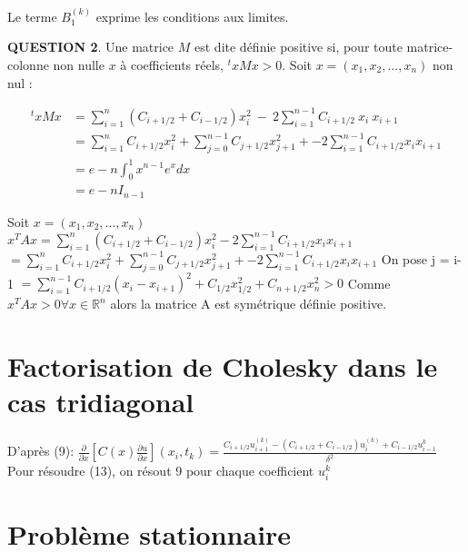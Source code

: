 \documentclass[a4paper,11pt]{article}
\newcommand{\R}{\mathbb{R}}
\newcommand{\quest}[1]{\small\textbf{#1}\normalsize}
\theoremstyle{nonumberplain}
\begin{document}
    \medskip
    Le terme $B_{1}^{(k)}$ exprime les conditions aux limites.

    \quest{QUESTION 2}. Une matrice $M$ est dite définie positive si, pour toute matrice-colonne non nulle $x$ à coefficients réels, $^txMx > 0$.
    Soit $x = (x_1, x_2, ... , x_n)$ non nul :

    \begin{equation*}
    \begin{split}
        ^txMx   & = \sum\limits_{i = 1}^{n} (C_{i+1/2} + C_{i-1/2}) x_i^2\ -\ 2 \sum\limits_{i = 1}^{n-1}C_{i+1/2}\ x_i\ x_{i+1} \\
                & = \sum\limits_{i = 1}^{n} C_{i+1/2} x_i^2 + \sum\limits_{j = 0}^{n-1} C_{j+1/2} x_{j+1}^2  + - 2 \sum\limits_{i = 1}^{n-1} C_{i+1/2} x_i x_{i+1} \\
                & = e - n\int_{0}^{1} x^{n-1}e^{x} dx \\
                & = e - n I_{n-1}
    \end{split}
    \end{equation*}


Soit $x = (x_1, x_2, ... , x_n)$
\newline
$x^TAx = \sum\limits_{i = 1}^{n} (C_{i+1/2} + C_{i-1/2}) x_i^2 - 2 \sum\limits_{i = 1}^{n-1} C_{i+1/2} x_i x_{i+1} $
\newline
$ = \sum\limits_{i = 1}^{n} C_{i+1/2} x_i^2 + \sum\limits_{j = 0}^{n-1} C_{j+1/2} x_{j+1}^2  + - 2 \sum\limits_{i = 1}^{n-1} C_{i+1/2} x_i x_{i+1} $ On pose j = i-1
\newline
$ = \sum\limits_{i = 1}^{n-1} C_{i+1/2} (x_i - x_{i+1})^2 + C_{1/2} x_{1/2}^2 + C_{n + 1/2} x_{n}^2 > 0 $
\newline
Comme $x^TAx > 0 \forall x \in \R ^n $ alors la matrice A est symétrique définie positive.
\newline


\section{Factorisation de Cholesky dans le cas tridiagonal}

D'après (9):
$ \frac{\partial}{\partial x}[C(x)\frac{\partial u}{\partial x}](x_i, t_k) = \frac{
C_{i+1/2}u_{i+1}^{(k)} - (C_{i+1/2} + C_{i-1/2})u_i^{(k)}+C_{i-1/2}u_{i-1}^{k}}{\delta^{2}}$
Pour résoudre (13), on résout 9 pour chaque coefficient $u_i^{k}$
\section{Problème stationnaire}
\end{document}
